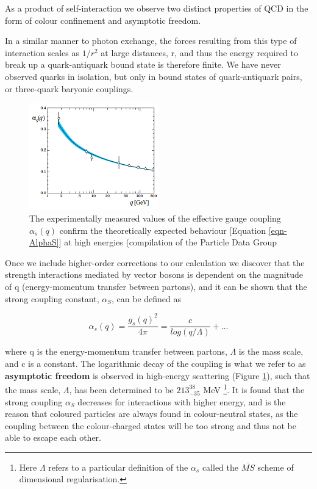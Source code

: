 As a product of self-interaction we observe two distinct properties of QCD in the form of colour confinement and asymptotic freedom. 

In a similar manner to photon exchange, the forces resulting from this type of interaction scales as $1/r^2$ at large distances, r, and thus the energy required to break up a quark-antiquark bound state is therefore finite. We have never observed quarks in isolation, but only in bound states of quark-antiquark pairs, or three-quark baryonic couplings.  

\begin{figure} \label{fig-AlphaS}
\begin{center}
\includegraphics[width=0.5\textwidth]{Figures/AlphaS.png}
\caption{The experimentally measured values of the effective gauge coupling $\alpha_s(q)$ confirm the theoretically expected behaviour [Equation \ref{eqn-AlphaS}] at high energies (compilation of the Particle Data Group \cite{AlphaS}}
\end{center}
\end{figure}

Once we include higher-order corrections to our calculation we discover that the strength interactions mediated by vector bosons is dependent on the magnitude of q (energy-momentum transfer between partons), and it can be shown that the strong coupling constant, $\alpha_S$, can be defined as

\begin{equation} \label{eqn-AlphaS}
\alpha_s(q) = \frac{g_s(q)^2}{4\pi} = \frac{c}{log(q/\Lambda)} + ...
\end{equation}

where q is the energy-momentum transfer between partons, $\Lambda$ is the mass scale, and c is a constant. The logarithmic decay of the coupling is what we refer to as \textbf{asymptotic freedom} is observed in high-energy scattering (Figure \ref{fig-AlphaS}), such that the mass scale, $\Lambda$, has been determined to be $213^{38}_{-35}$ MeV \cite{Bethke:2000ai}\footnote{Here $\Lambda$ refers to a particular definition of the $\alpha_s$ called the $\overline{MS}$ scheme of dimensional regularisation.}. It is found that the strong coupling $\alpha_S$ decreases for interactions with higher energy, and is the reason that coloured particles are always found in colour-neutral states, as the coupling between the colour-charged states will be too strong and thus not be able to escape each other.

